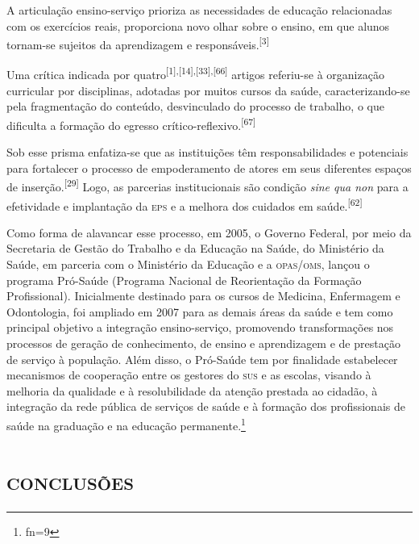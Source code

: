 \documentclass{article}
\makeatletter
\newcommand{\fn}{\afterassignment\fn@aux\count0=}
\newcommand{\fn@aux}{\csname fn\the\count0\endcsname}
\makeatother
\begin{document}
A articulação ensino-serviço prioriza as necessidades de educação relacionadas
com os exercícios reais, proporciona novo olhar sobre o ensino, em que alunos
tornam-se sujeitos da aprendizagem e responsáveis.\textsuperscript{[}\textsuperscript{3}\textsuperscript{]}

Uma crítica indicada por quatro\textsuperscript{[}\textsuperscript{1}\textsuperscript{]}\textsuperscript{,}\textsuperscript{[}\textsuperscript{14}\textsuperscript{]}\textsuperscript{,}\textsuperscript{[}\textsuperscript{33}\textsuperscript{]}\textsuperscript{,}\textsuperscript{[}\textsuperscript{66}\textsuperscript{]}
artigos referiu-se à organização curricular por disciplinas, adotadas por muitos
cursos da saúde, caracterizando-se pela fragmentação do conteúdo, desvinculado
do processo de trabalho, o que dificulta a formação do egresso
crítico-reflexivo.\textsuperscript{[}\textsuperscript{67}\textsuperscript{]}

Sob esse prisma enfatiza-se que as instituições têm responsabilidades e
potenciais para fortalecer o processo de empoderamento de atores em seus
diferentes espaços de inserção.\textsuperscript{[}\textsuperscript{29}\textsuperscript{]}
Logo, as parcerias institucionais são condição \textit{sine qua non}
para a efetividade e implantação da \textsc{eps} e a melhora dos cuidados em saúde.\textsuperscript{[}\textsuperscript{62}\textsuperscript{]}

Como forma de alavancar esse processo, em 2005, o Governo Federal, por meio da
Secretaria de Gestão do Trabalho e da Educação na Saúde, do Ministério da Saúde,
em parceria com o Ministério da Educação e a \textsc{opas}/\textsc{oms}, lançou o programa
Pró-Saúde (Programa Nacional de Reorientação da Formação Profissional).
Inicialmente destinado para os cursos de Medicina, Enfermagem e Odontologia, foi
ampliado em 2007 para as demais áreas da saúde e tem como principal objetivo a
integração ensino-serviço, promovendo transformações nos processos de geração de
conhecimento, de ensino e aprendizagem e de prestação de serviço à população.
Além disso, o Pró-Saúde tem por finalidade estabelecer mecanismos de cooperação
entre os gestores do \textsc{sus} e as escolas, visando à melhoria da qualidade e à
resolubilidade da atenção prestada ao cidadão, à integração da rede pública de
serviços de saúde e à formação dos profissionais de saúde na graduação e na
educação permanente.\footnote{\fn9}

\section{\textsc{conclusões}}
\end{document}

